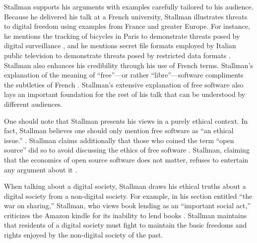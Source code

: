 Stallman supports his arguments with examples carefully tailored to his
audience. Because he delivered his talk at a French university, Stallman
illustrates threats to digital freedom using examples from France and greater
Europe. For instance, he mentions the tracking of bicycles in Paris to
demonstrate threats posed by digital surveillance \citeyear[para. 8]{rms2011}, and he
mentions secret file formats employed by Italian public television to
demonstrate threats posed by restricted data formats \citeyear[para. 30]{rms2011}.
Stallman also enhances his credibility through his use of French terms.
Stallman's explanation of the meaning of “free”—or rather “libre”—software
compliments the subtleties of French \citeyear[para. 34]{rms2011}. Stallman's extensive
explanation of free software also lays an important foundation for the rest of
his talk that can be understood by different audiences.

One should note that Stallman presents his views in a purely ethical context.
In fact, Stallman believes one should only mention free software as “an ethical
issue.” \citeyear[para. 63]{rms2011}. Stallman claims additionally that those who coined
the term “open source” did so to avoid discussing the ethics of free software
\citeyear[para. 52]{rms2011}. Stallman, claiming that the economics of open source software
does not matter, refuses to entertain any argument about it \citeyear[para. 34]{rms2011}.

When talking about a digital society, Stallman draws his ethical truths about a
digital society from a non-digital society. For example, in his section
entitled “the war on sharing,” Stallman, who views book lending as an
“important social act,” criticizes the Amazon kindle for its inability to lend
books \citeyear[para. 98]{rms2011}. Stallman maintains that residents of a digital society
must fight to maintain the basic freedoms and rights enjoyed by the non-digital
society of the past.
